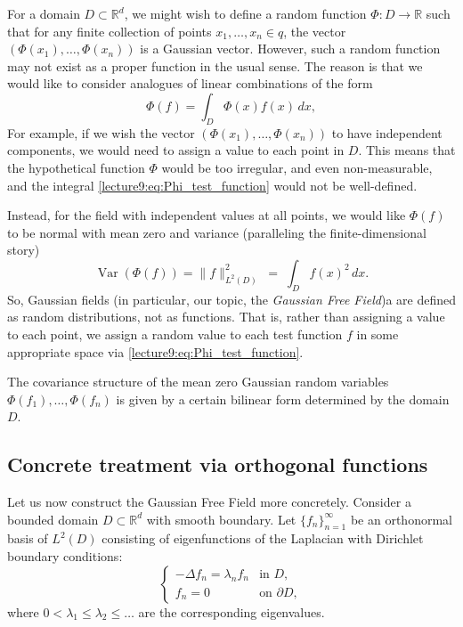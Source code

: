 \documentclass[letterpaper,11pt,oneside,reqno]{book}
\numberwithin{equation}{chapter}  %
\theoremstyle{definition}
\begin{document}
For a domain $D \subset \mathbb{R}^d$, we might wish to
define a random function $\Phi: D \rightarrow \mathbb{R}$
such that for any finite collection of points $x_1, \ldots,
x_n \in q$, the vector $(\Phi(x_1), \ldots, \Phi(x_n))$ is a
Gaussian vector. However, such a random function may not
exist as a proper function in the usual sense.
The reason is that we would like to consider analogues of linear combinations
of the form
\begin{equation}
	\label{lecture9:eq:Phi_test_function}
    \Phi(f) = \int_D \Phi(x) f(x) \, dx,
\end{equation}
For example, if we wish the vector $(\Phi(x_1), \ldots, \Phi(x_n))$ to have independent components, we would need to assign a value to each point in $D$. This means that the hypothetical function $\Phi$ would be too irregular, and even non-measurable, and the integral
\eqref{lecture9:eq:Phi_test_function} would not be well-defined.

Instead, for the field with independent values at all points, we would like $\Phi(f)$ to be normal
with mean zero and variance (paralleling the finite-dimensional story)
\begin{equation*}
	\operatorname{\mathrm{Var}}\left(
	\Phi(f)\right) = \|f\|^2_{L^2(D)} \;=\; \int_D f(x)^2 \, dx.
\end{equation*}
So, Gaussian fields (in particular, our topic, the \emph{Gaussian Free Field})a
are defined as random distributions, not as functions.
That is, rather than assigning a value to each point,
we assign a random value to each test function $f$ in some appropriate space
via \eqref{lecture9:eq:Phi_test_function}.

The covariance structure of the mean zero Gaussian random variables
$\Phi(f_1), \ldots, \Phi(f_n)$ is given by a certain bilinear
form determined by the domain $D$.


\subsection{Concrete treatment via orthogonal functions}

Let us now construct the Gaussian Free Field more concretely. Consider a bounded domain $D \subset \mathbb{R}^d$ with smooth boundary. Let $\{f_n\}_{n=1}^{\infty}$ be an orthonormal basis of $L^2(D)$ consisting of eigenfunctions of the Laplacian with Dirichlet boundary conditions:
\begin{equation}
    \begin{cases}
        -\Delta f_n = \lambda_n f_n & \text{in } D, \\
        f_n = 0 & \text{on } \partial D,
    \end{cases}
\end{equation}
where $0 < \lambda_1 \leq \lambda_2 \leq \ldots$ are the corresponding eigenvalues.
\end{document}
